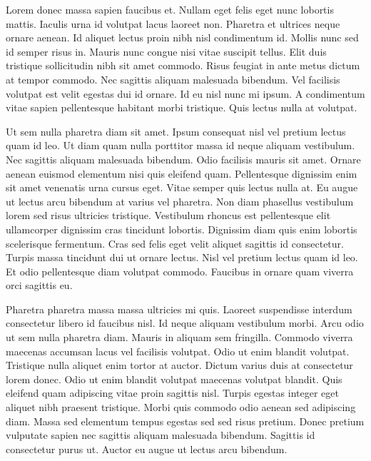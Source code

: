 \documentclass[11pt,a4paper]{article}
\begin{document}
Lorem donec massa sapien faucibus et. Nullam eget felis eget nunc lobortis mattis. Iaculis urna id volutpat lacus laoreet non. Pharetra et ultrices neque ornare aenean. Id aliquet lectus proin nibh nisl condimentum id. Mollis nunc sed id semper risus in. Mauris nunc congue nisi vitae suscipit tellus. Elit duis tristique sollicitudin nibh sit amet commodo. Risus feugiat in ante metus dictum at tempor commodo. Nec sagittis aliquam malesuada bibendum. Vel facilisis volutpat est velit egestas dui id ornare. Id eu nisl nunc mi ipsum. A condimentum vitae sapien pellentesque habitant morbi tristique. Quis lectus nulla at volutpat.

Ut sem nulla pharetra diam sit amet. Ipsum consequat nisl vel pretium lectus quam id leo. Ut diam quam nulla porttitor massa id neque aliquam vestibulum. Nec sagittis aliquam malesuada bibendum. Odio facilisis mauris sit amet. Ornare aenean euismod elementum nisi quis eleifend quam. Pellentesque dignissim enim sit amet venenatis urna cursus eget. Vitae semper quis lectus nulla at. Eu augue ut lectus arcu bibendum at varius vel pharetra. Non diam phasellus vestibulum lorem sed risus ultricies tristique. Vestibulum rhoncus est pellentesque elit ullamcorper dignissim cras tincidunt lobortis. Dignissim diam quis enim lobortis scelerisque fermentum. Cras sed felis eget velit aliquet sagittis id consectetur. Turpis massa tincidunt dui ut ornare lectus. Nisl vel pretium lectus quam id leo. Et odio pellentesque diam volutpat commodo. Faucibus in ornare quam viverra orci sagittis eu.

Pharetra pharetra massa massa ultricies mi quis. Laoreet suspendisse interdum consectetur libero id faucibus nisl. Id neque aliquam vestibulum morbi. Arcu odio ut sem nulla pharetra diam. Mauris in aliquam sem fringilla. Commodo viverra maecenas accumsan lacus vel facilisis volutpat. Odio ut enim blandit volutpat. Tristique nulla aliquet enim tortor at auctor. Dictum varius duis at consectetur lorem donec. Odio ut enim blandit volutpat maecenas volutpat blandit. Quis eleifend quam adipiscing vitae proin sagittis nisl. Turpis egestas integer eget aliquet nibh praesent tristique. Morbi quis commodo odio aenean sed adipiscing diam. Massa sed elementum tempus egestas sed sed risus pretium. Donec pretium vulputate sapien nec sagittis aliquam malesuada bibendum. Sagittis id consectetur purus ut. Auctor eu augue ut lectus arcu bibendum.
\end{document}
